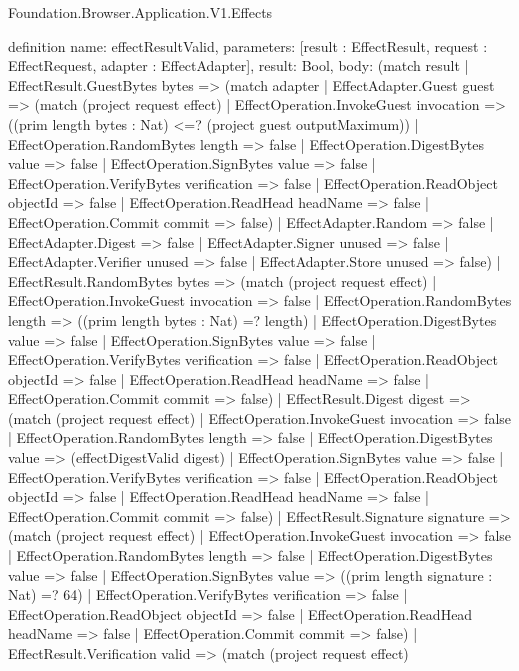 \begin{lexlean}{Foundation.Browser.Application.V1.Effects}
\begin{semanticmodule}
definition{
  name: effectResultValid,
  parameters: [result : EffectResult, request : EffectRequest, adapter : EffectAdapter],
  result: Bool,
  body: (match result
    | EffectResult.GuestBytes bytes => (match adapter
      | EffectAdapter.Guest guest => (match (project request effect)
        | EffectOperation.InvokeGuest invocation => ((prim length bytes : Nat) <=? (project guest outputMaximum))
        | EffectOperation.RandomBytes length => false
        | EffectOperation.DigestBytes value => false
        | EffectOperation.SignBytes value => false
        | EffectOperation.VerifyBytes verification => false
        | EffectOperation.ReadObject objectId => false
        | EffectOperation.ReadHead headName => false
        | EffectOperation.Commit commit => false)
      | EffectAdapter.Random => false
      | EffectAdapter.Digest => false
      | EffectAdapter.Signer unused => false
      | EffectAdapter.Verifier unused => false
      | EffectAdapter.Store unused => false)
    | EffectResult.RandomBytes bytes => (match (project request effect)
      | EffectOperation.InvokeGuest invocation => false
      | EffectOperation.RandomBytes length => ((prim length bytes : Nat) =? length)
      | EffectOperation.DigestBytes value => false
      | EffectOperation.SignBytes value => false
      | EffectOperation.VerifyBytes verification => false
      | EffectOperation.ReadObject objectId => false
      | EffectOperation.ReadHead headName => false
      | EffectOperation.Commit commit => false)
    | EffectResult.Digest digest => (match (project request effect)
      | EffectOperation.InvokeGuest invocation => false
      | EffectOperation.RandomBytes length => false
      | EffectOperation.DigestBytes value => (effectDigestValid digest)
      | EffectOperation.SignBytes value => false
      | EffectOperation.VerifyBytes verification => false
      | EffectOperation.ReadObject objectId => false
      | EffectOperation.ReadHead headName => false
      | EffectOperation.Commit commit => false)
    | EffectResult.Signature signature => (match (project request effect)
      | EffectOperation.InvokeGuest invocation => false
      | EffectOperation.RandomBytes length => false
      | EffectOperation.DigestBytes value => false
      | EffectOperation.SignBytes value => ((prim length signature : Nat) =? 64)
      | EffectOperation.VerifyBytes verification => false
      | EffectOperation.ReadObject objectId => false
      | EffectOperation.ReadHead headName => false
      | EffectOperation.Commit commit => false)
    | EffectResult.Verification valid => (match (project request effect)
}
\end{semanticmodule}
\end{lexlean}

